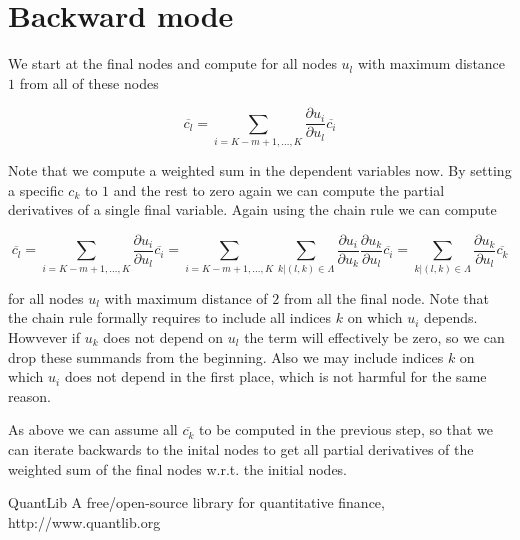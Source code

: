 \documentclass{amsart}
\theoremstyle{plain}
\numberwithin{equation}{section}
\begin{document}
\section{Backward mode}

We start at the final nodes and compute for all nodes $u_l$ with maximum distance $1$ from all of these nodes

\begin{equation}
\overline{c_l} = \sum_{i=K-m+1,\dots,K} \frac{\partial u_i}{\partial u_l} \overline{c_i}
\end{equation}

Note that we compute a weighted sum in the dependent variables now. By setting a specific $c_k$ to $1$ and the rest to zero again we can compute the partial derivatives of a single final variable. Again using the chain rule we can compute 

\begin{equation}
\overline{c_l} = \sum_{i=K-m+1,\dots,K} \frac{\partial u_i}{\partial u_l} \overline{c_i} = \sum_{i=K-m+1,\dots,K}\sum_{k|(l,k)\in\Lambda} \frac{\partial u_i}{\partial u_k}\frac{\partial u_k}{\partial u_l} \overline{c_i} = \sum_{k|(l,k)\in\Lambda} \frac{\partial u_k}{\partial u_l} \overline{c_k}
\end{equation}

for all nodes $u_l$ with maximum distance of $2$ from all the final node. Note that the chain rule formally requires to include all indices $k$ on which $u_i$ depends. Howvever if $u_k$ does not depend on $u_l$ the term will effectively be zero, so we can drop these summands from the beginning. Also we may include indices $k$ on which $u_i$ does not depend in the first place, which is not harmful for the same reason.

As above we can assume all $\overline{c_k}$ to be computed in the previous step, so that we can iterate backwards to the inital nodes to get all partial derivatives of the weighted sum of the final nodes w.r.t. the initial nodes.



\begin{thebibliography}{2}

QuantLib A free/open-source library for quantitative finance, http://www.quantlib.org

\end{thebibliography}
\end{document}
